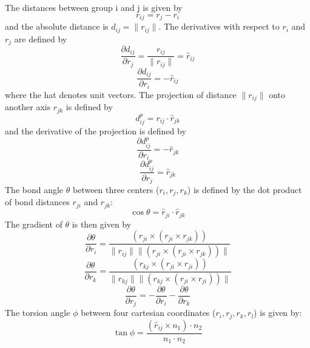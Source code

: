 The distances between group i and j is given by
\begin{equation}
 r_{ij} = r_j - r_i
\end{equation}
and the absolute distance is $d_{ij} = \| r_{ij}\|$.
The derivatives with respect to $r_i$ and $r_j$ are defined by
\begin{equation}
  \frac{\partial d_{ij}}{\partial r_j} = \frac{r_{ij}}{\|r_{ij}\|} = \hat{r}_{ij}
\end{equation}
\begin{equation}
  \frac{\partial d_{ij}}{\partial r_i} = - \hat{r}_{ij}
\end{equation}
where the hat denotes unit vectors.
The projection of distance $\| r_{ij}\|$ onto another axis $r_{jk}$ is defined by
\begin{equation}
  d^p_{ij} = r_{ij} \cdot \hat{r}_{jk}
\end{equation}
and the derivative of the projection is defined by
\begin{equation}
   \frac{\partial d^p_{ij}}{\partial r_i} = -\hat{r}_{jk}
\end{equation}
\begin{equation}
   \frac{\partial d^p_{ij}}{\partial r_j} = \hat{r}_{jk}
\end{equation}
The bond angle $\theta$ between three centers ($r_i, r_j, r_k$) is defined by the dot product of bond distances $r_{ji}$ and $r_{jk}$:
\begin{equation}
  \cos \theta = \hat{r}_{ji} \cdot \hat{r}_{jk}
\end{equation}
The gradient of $\theta$ is then given by
\begin{equation}
  \frac{\partial \theta}{\partial r_i} = \frac{(r_{ji} \times (r_{ji} \times r_{jk})) }{\| r_{ij}\| \| (r_{ji} \times (r_{ji} \times r_{jk})) \|}
\end{equation}
\begin{equation}
  \frac{\partial \theta}{\partial r_k} = \frac{(r_{kj} \times (r_{ji} \times r_{ji}))}{\| r_{kj}\| \| (r_{kj} \times (r_{ji} \times r_{ji})) \|}
\end{equation}
\begin{equation}
  \frac{\partial \theta}{\partial r_j}= -\frac{\partial \theta}{\partial r_i} - \frac{\partial \theta}{\partial r_k}
\end{equation}
The torsion angle $\phi$ between four cartesian coordinates ($r_i, r_j, r_k, r_l$) is given by:
\begin{equation}
  \tan \phi = \frac{(\hat{r}_{ij} \times n_1) \cdot n_2}{n_1 \cdot n_2}
\end{equation}
